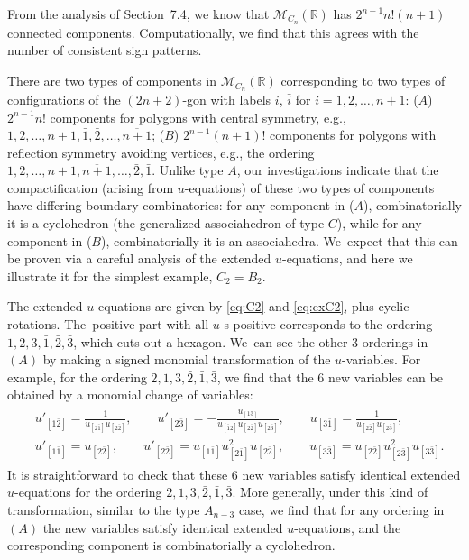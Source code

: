 \documentclass[10pt,a4paper]{amsart}
\def\R{{\mathbb R}}
\def\M{{\mathcal{M}}}
\numberwithin{equation}{section}
\begin{document}
\bigskip{}
From the analysis of Section~7.4, we know that $\M_{C_n}(\R)$ has $2^{n{-}1}n! (n+1)$ connected components. Computationally, we find that this agrees with the number of consistent sign patterns.

There are two types of components in ${\mathcal M}_{C_n}(\R)$ corresponding to two types of configurations of the $(2n{+}2)$-gon with labels $i$, $\bar{i}$ for $i=1,2, \dots, n{+}1$: ($A$) $2^{n{-}1} n!$ components for polygons with central symmetry, e.g., $1,2, \dots, n{+}1, \bar{1}, \bar{2}, \dots, \overline{n{+}1}$; ($B$) $2^{n{-}1} (n{+}1)!$ components for polygons with reflection symmetry avoiding vertices, e.g., the ordering $1, 2, \dots, n{+}1, \overline{n{+}1}, \dots, \bar{2}, \bar{1}$. Unlike type $A$, our investigations indicate that the compactification (arising from $u$-equations) of these two types of components have differing boundary combinatorics: for any component in ($A$), combinatorially it is a cyclohedron (the generalized associahedron of type $C$), while for any component in ($B$), combinatorially it is an associahedra. We~expect that this can be proven via a careful analysis of the extended $u$-equations, and here we illustrate it for the simplest example, $C_2=B_2$.

The extended $u$-equations are given by \eqref{eq:C2} and \eqref{eq:exC2}, plus cyclic rotations. The~positive part with all $u$-s positive corresponds to the ordering $1,2,3,\bar{1}, \bar{2}, \bar{3}$, which cuts out a hexagon. We~can see the other $3$ orderings in $(A)$ by making a signed monomial transformation of the $u$-variables. For example, for the ordering $2,1,3, \bar{2}, \bar{1}, \bar{3}$, we find that the $6$ new variables can be obtained by a monomial change of variables:
\begin{gather*}
\begin{split}
&u'_{[1 \bar{2}]}=\frac{1}{u_{[2 \bar{1}] }u_{[2 \bar{2}]}},\qquad
u'_{[2 \bar{3}]}=-\frac{u_{[1 3]}}{u_{[\bar{1} 2]} u_{[2 \bar{2}]} u_{[2 \bar{3}]}}, \qquad
u_{[3 \bar{1}]}=\frac{1}{u_{[2 \bar{2}]}u_{[2 \bar{3}]}},
\\
&u'_{[1 \bar{1}]}=u_{[2 \bar{2}]},\qquad
u'_{[2 \bar{2}]}=u_{[1 \bar{1}]} u^2_{[2 \bar{1}]} u_{[2 \bar{2}]},\qquad
u_{[3 \bar{3}]}=u_{[2 \bar{2}]} u^2_{[2 \bar{3}]}u_{[3 \bar{3}]}.
\end{split}
\end{gather*}
It is straightforward to check that these $6$ new variables satisfy identical extended $u$-equations for the ordering $2,1, 3, \bar{2}, \bar{1}, \bar{3}$. More generally, under this kind of transformation, similar to the type $A_{n-3}$ case, we find that for any ordering in $(A)$ the new variables satisfy identical extended $u$-equations, and the corresponding component is combinatorially a cyclohedron.
\end{document}
